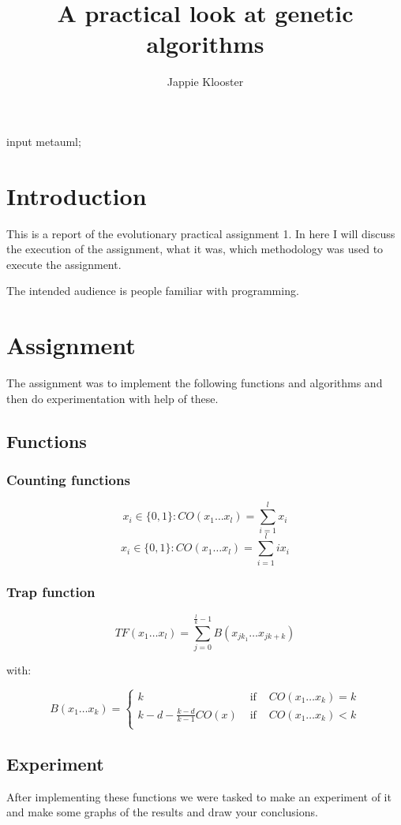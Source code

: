 \documentclass{article}
\begin{document}
\begin{empfile}
\begin{empcmds}
input metauml;
\end{empcmds}
\author{Jappie Klooster}
\title{A practical look at genetic algorithms}
\maketitle

\section{Introduction}
This is a report of the evolutionary practical assignment 1.
In here I will discuss the execution of the assignment, what it was, which
methodology was used to execute the assignment.

The intended audience is people familiar with programming.

\section{Assignment}
The assignment was to implement the following functions and algorithms and
then do experimentation with help of these.

\subsection{Functions}
\subsubsection{Counting functions}
\[x_i \in \{0,1\}:CO(x_1\dots x_l)=\sum^l_{i=1}x_i\]
\[x_i \in \{0,1\}:CO(x_1\dots x_l)=\sum^l_{i=1}i x_i\]
\subsubsection{Trap function}
\[TF(x_1\dots x_l) = \sum^{\frac{l}{k}-1}_{j=0}B(x_{jk_1}\dots x_{jk+k})\]

with:

\[B(x_1\dots x_k)=\left\{
	\begin{matrix}
		k & \mbox{ if } &   CO(x_1\dots x_k) = k \\
		k - d - \frac{k-d}{k-1} CO(x) & \mbox{ if } & CO(x_1\dots x_k) < k \\
	\end{matrix}
\right. \]

\subsection{Experiment}
After implementing these functions we were tasked to make an experiment of it
and make some graphs of the results and draw your conclusions.


\end{empfile}
\end{document}
